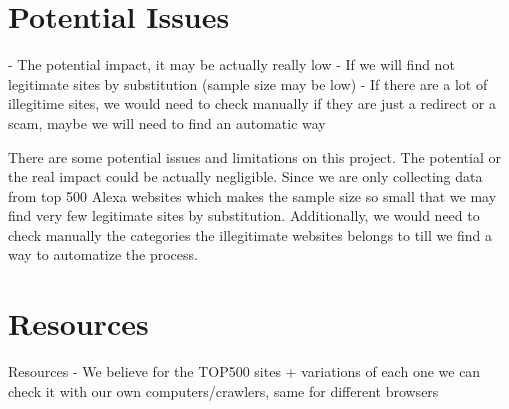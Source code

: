 \documentclass[letterpaper,twocolumn,10pt]{article}
\begin{document}
\section{Potential Issues}
- The potential impact, it may be actually really low
- If we will find not legitimate sites by substitution (sample size may be low)
- If there are a lot of illegitime sites, we would need to check manually if they are just a redirect or a scam, maybe we will need to find an automatic way

There are some potential issues and limitations on this project. The potential or the real impact could be actually negligible. Since we are only collecting data from top 500 Alexa websites which makes the sample size so small that we may find very few legitimate sites by substitution. Additionally, we would need to check manually the categories the illegitimate websites belongs to till we find a way to automatize the process. 

\section{Resources}
Resources
- We believe for the TOP500 sites + variations of each one we can check it with our own computers/crawlers, same for different browsers
\end{document}
